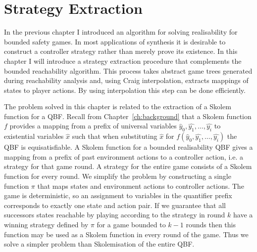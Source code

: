 \chapter{Strategy Extraction}
\label{ch:strategy}

\newcommand{\strategyext}[0]{\textsc{strategyGen}\xspace}
\newcommand{\genstrategy}{\textsc{strategyGen}}
\newcommand{\strategy}[0]{\textsc{strategy}\xspace}
\newcommand{\partition}[0]{\textsc{partition}\xspace}
\newcommand{\ogametree}[0]{\mbox{\sc OppGT}}
\newcommand{\eagametree}[0]{\mbox{\sc AbsGT}'}
\newcommand{\pgametree}[0]{\mbox{\sc Cand}}
\newcommand{\apgametree}[0]{\mbox{\sc AbsSolvedGT}}
\newcommand{\opgametree}[0]{\mbox{\sc Spoiling}}

\newcommand{\opptf}[0]{\textsc{\textoverline{treeFormula}}\xspace}

\newcommand{\clk}[0]{\texttt{clk}}
\newcommand{\curr}[0]{\texttt{curr}}
\newcommand{\err}[0]{\texttt{err}}
\newcommand{\nex}[0]{\texttt{next}}
\newcommand{\inp}[0]{\texttt{in}}

In the previous chapter I introduced an algorithm for solving realisability for bounded safety games. In most applications of synthesis it is desirable to construct a controller strategy rather than merely prove its existence. In this chapter I will introduce a strategy extraction procedure that complements the bounded reachability algorithm. This process takes abstract game trees generated during reachability analysis and, using Craig interpolation, extracts mappings of states to player actions. By using interpolation this step can be done efficiently.

The problem solved in this chapter is related to the extraction of a Skolem function for a QBF. Recall from Chapter~\ref{ch:background} that a Skolem function $f$ provides a mapping from a prefix of universal variables $\hat{y}_0, \hat{y_1}, \ldots, \hat{y_i}$ to existential variables $\hat{x}$ such that when substituting $\hat{x}$ for $f(\hat{y}_0, \hat{y_1}, \ldots, \hat{y_i})$ the QBF is equisatisfiable. A Skolem function for a bounded realisability QBF gives a mapping from a prefix of past environment actions to a controller action, i.e. a strategy for that game round. A strategy for the entire game consists of a Skolem function for every round. We simplify the problem by constructing a single function $\pi$ that maps states and environment actions to controller actions. The game is deterministic, so an assignment to variables in the quantifier prefix corresponds to exactly one state and action pair.  If we guarantee that all successors states reachable by playing according to the strategy in round $k$ have a winning strategy defined by $\pi$ for a game bounded to $k-1$ rounds then this function may be used as a Skolem function in every round of the game. Thus we solve a simpler problem than Skolemisation of the entire QBF.

